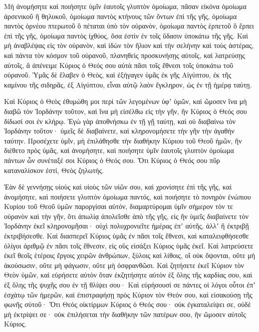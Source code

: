 {Μὴ ἀνομήσητε καὶ ποιήσητε ὑμῖν ἑαυτοῖς γλυπτὸν ὁμοίωμα, πᾶσαν εἰκόνα ὁμοίωμα ἀρσενικοῦ ἢ θηλυκοῦ,
ὁμοίωμα παντὸς κτήνους τῶν ὄντων ἐπὶ τῆς γῆς, ὁμοίωμα παντὸς ὀρνέου πτερωτοῦ ὃ πέταται ὑπὸ τὸν οὐρανὸν,
ὁμοίωμα παντὸς ἑρπετοῦ ὃ ἕρπει ἐπὶ τῆς γῆς, ὁμοίωμα παντὸς ἰχθύος, ὅσα ἐστὶν ἐν τοῖς ὕδασιν ὑποκάτω τῆς γῆς.
Καὶ μὴ ἀναβλέψας εἰς τὸν οὐρανὸν, καὶ ἰδὼν τὸν ἥλιον καὶ τὴν σελήνην καὶ τοὺς ἀστέρας, καὶ πάντα τὸν κόσμον τοῦ οὐρανοῦ, πλανηθεὶς προσκυνήσῃς αὐτοῖς, καὶ λατρεύσῃς αὐτοῖς, ἃ ἀπένειμε Κύριος ὁ Θεός σου αὐτὰ πᾶσι τοῖς ἔθνεσι τοῖς ὑποκάτω τοῦ οὐρανοῦ.
Ὑμᾶς δὲ ἔλαβεν ὁ Θεὸς, καὶ ἐξήγαγεν ὑμᾶς ἐκ γῆς Αἰγύπτου, ἐκ τῆς καμίνου τῆς σιδηρᾶς, ἐξ Αἰγύπτου, εἶναι αὐτῷ λαὸν ἔγκληρον, ὡς ἐν τῇ ἡμέρᾳ ταύτῃ.
\par }{\PP {}Καὶ Κύριος ὁ Θεὸς ἐθυμώθη μοι περὶ τῶν λεγομένων ὑφʼ ὑμῶν, καὶ ὤμοσεν ἵνα μὴ διαβῶ τὸν Ἰορδάνην τοῦτον, καὶ ἵνα μὴ εἰσέλθω εἰς τὴν γῆν, ἣν Κύριος ὁ Θεός σου δίδωσί σοι ἐν κλήρῳ.
Ἐγὼ γὰρ ἀποθνήσκω ἐν τῇ γῇ ταύτῃ, καὶ οὐ διαβαίνω τὸν Ἰορδάνην τοῦτον· ὑμεῖς δὲ διαβαίνετε, καὶ κληρονομήσετε τὴν γῆν τὴν ἀγαθὴν ταύτην.
Προσέχετε ὑμῖν, μὴ ἐπιλάθησθε τὴν διαθήκην Κύριου τοῦ Θεοῦ ἡμῶν, ἣν διέθετο πρὸς ὑμᾶς, καὶ ἀνομήσητε, καὶ ποιήσητε ὑμῖν ἑαυτοῖς γλυπτὸν ὁμοίωμα πάντων ὧν συνέταξέ σοι Κύριος ὁ Θεός σου.
Ὅτι Κύριος ὁ Θεός σου πῦρ καταναλίσκον ἐστί, Θεὸς ζηλωτής.
\par }{\PP {}Ἐὰν δὲ γεννήσῃς υἱοὺς καὶ υἱοὺς τῶν υἱῶν σου, καὶ χρονίσητε ἐπὶ τῆς γῆς, καὶ ἀνομήσητε, καὶ ποιήσετε γλυπτὸν ὁμοίωμα παντός, καὶ ποιήσητε τὸ πονηρὸν ἐνώπιου Κυρίου τοῦ Θεοῦ ὑμῶν παροργίσαι αὐτόν,
διαμαρτύρομαι ὑμῖν σήμερον τὸν τε οὐρανὸν καὶ τὴν γῆν, ὅτι ἀπωλίᾳ ἀπολεῖσθε ἀπὸ τῆς γῆς, εἰς ἣν ὑμεῖς διαβαίνετε τὸν Ἰορδάνην ἐκεῖ κληρονομῆσαι· οὐχὶ πολυχρονιεῖτε ἡμέρας ἐπʼ αὐτῆς, ἀλλʼ ἢ ἐκτριβῇ ἐκτριβήσεσθε.
Καὶ διασπερεῖ Κύριος ὑμᾶς ἐν πᾶσι τοῖς ἔθνεσι, καὶ καταλειφθήσεσθε ὀλίγοι ἀριθμῷ ἐν πᾶσι τοῖς ἔθνεσιν, εἰς οὓς εἰσάξει Κύριος ὑμᾶς ἐκεῖ.
Καὶ λατρεύσετε ἐκεῖ θεοῖς ἑτέροις ἔργοις χειρῶν ἀνθρώπων, ξύλοις καὶ λίθοις, οἳ οὐκ ὄψονται, οὔτε μὴ ἀκούσωσιν, οὔτε μὴ φάγωσιν, οὔτε μὴ ὀσφρανθῶσι.
Καὶ ζητήσετε ἐκεῖ Κύριον τὸν Θεὸν ὑμῶν, καὶ εὑρήσετε αὐτὸν ὅταν ἐκζητήσητε αὐτὸν ἐξ ὅλης τῆς καρδίας σου, καὶ ἐξ ὅλης τῆς ψυχῆς σου ἐν τῇ θλίψει σου·
Καὶ εὑρήσουσί σε πάντες οἱ λόγοι οὗτοι ἐπʼ ἐσχάτῳ τῶν ἡμερῶν, καὶ ἐπιστραφήσῃ πρὸς Κύριον τὸν Θεόν σου, καὶ εἰσακούσῃ τῆς φωνῆς σὐτοῦ·
Ὅτι Θεὸς οἰκτίρμων Κύριος ὁ Θεός σου· οὐκ ἐγκαταλείψει σε, οὐδὲ μὴ ἐκτρίψει σε· οὐκ ἐπιλήσεται τὴν διαθήκην τῶν πατέρων σου, ἣν ὤμοσεν αὐτοῖς Κύριος.
}
